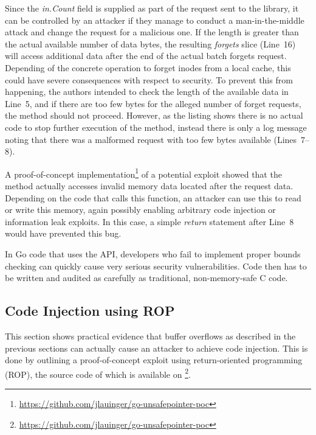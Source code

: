 Since the \textit{in.Count} field is supplied as part of the request sent to the library, it can be controlled by an
attacker if they manage to conduct a man-in-the-middle attack and change the request for a malicious
one.
If the length is greater than the actual available number of data bytes, the resulting \textit{forgets} slice
(Line~16) will access additional data after the end of the actual batch forgets request.
Depending of the concrete operation to forget inodes from a local cache, this could have severe consequences with
respect to security.
To prevent this from happening, the authors intended to check the length of the available data in Line~5, and if there
are too few bytes for the alleged number of forget requests, the method should not proceed.
However, as the listing shows there is no actual code to stop further execution of the method, instead there is only a
log message noting that there was a malformed request with too few bytes available (Lines~7--8).

A proof-of-concept implementation\footnote{\url{https://github.com/jlauinger/go-unsafepointer-poc}} of a potential
exploit showed that the method actually accesses invalid memory data located after the request data.
Depending on the code that calls this function, an attacker can use this to read or write this memory, again possibly
enabling arbitrary code injection or information leak exploits.
In this case, a simple \textit{return} statement after Line~8 would have prevented this bug.

\begin{insight}
    In Go code that uses the \unsafe{} \acrshort{API}, developers who fail to implement proper bounds checking can
    quickly cause very serious security vulnerabilities.
    Code then has to be written and audited as carefully as traditional, non-memory-safe C code.
\end{insight}



\subsection{Code Injection using ROP}\label{subsec:unsafe-security-problems:buffer-overflow:code-flow-redirection}

This section shows practical evidence that buffer overflows as described in the previous sections can actually cause an
attacker to achieve code injection.
This is done by outlining a proof-of-concept exploit using return-oriented programming (\acrshort{ROP}), the source code
of which is available on \github{}\footnote{\url{https://github.com/jlauinger/go-unsafepointer-poc}}.

